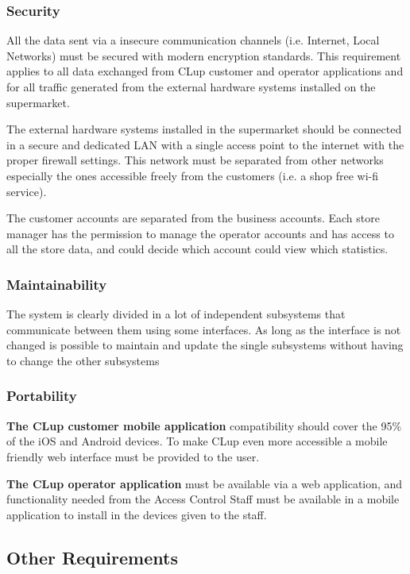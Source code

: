 \subsubsection{Security}
    All the data sent via a insecure communication channels (i.e. Internet, Local Networks) must be secured with modern encryption standards. This requirement applies to all data exchanged from CLup customer and operator applications and for all traffic generated from the external hardware systems installed on the supermarket. 

    \smallskip

    The external hardware systems installed in the supermarket should be connected in a secure and dedicated LAN with a single access point to the internet with the proper firewall settings. This network must be separated from other networks especially the ones accessible freely from the customers (i.e. a shop free wi-fi service). 

    \smallskip

    The customer accounts are separated from the business accounts. Each store manager has the permission to manage the operator accounts and has access to all the store data, and could decide which account could view which statistics.
\subsubsection{Maintainability}
    The system is clearly divided in a lot of independent subsystems that communicate between them using some interfaces. As long as the interface is not changed is possible to maintain and update the single subsystems without having to change the other subsystems
\subsubsection{Portability}
    \textbf{The CLup customer mobile application} compatibility should cover the 95\% of the iOS and Android devices. To make CLup even more accessible a mobile friendly web interface must be provided to the user.

    \smallskip 

    \textbf{The CLup operator application} must be available via a web application, and functionality needed from the Access Control Staff must be available in a mobile application to install in the devices given to the staff.  
\subsection{Other Requirements}
